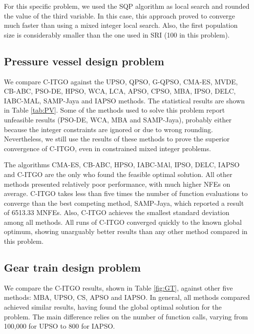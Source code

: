 For this specific problem, we used the SQP algorithm as local search and rounded the value of the third variable. In this case, this approach proved to converge much faster than using a mixed integer local search. Also, the first population size is considerably smaller than the one used in SRI (100 in this problem).



\subsection{Pressure vessel design problem}




We compare C-ITGO against the UPSO, QPSO, G-QPSO, CMA-ES, MVDE, CB-ABC, PSO-DE, HPSO, WCA, LCA, APSO, CPSO, MBA, IPSO, DELC, IABC-MAL, SAMP-Jaya and IAPSO methods. The statistical results are shown in Table \ref{tab:PV}. Some of the methods used to solve this problem report unfeasible results (PSO-DE, WCA, MBA and SAMP-Jaya), probably either because the integer constraints are ignored or due to wrong rounding. Nevertheless, we still use the results of these methods to prove the superior convergence of C-ITGO, even in constrained mixed integer problems.





The algorithms CMA-ES, CB-ABC, HPSO, IABC-MAl, IPSO, DELC, IAPSO and C-ITGO are the only who found the feasible optimal solution. All other methods presented relatively poor performance, with much higher NFEs on average. C-ITGO takes less than five times the number of function evaluations to converge than the best competing method, SAMP-Jaya, which reported a result of 6513.33 MNFEs. Also, C-ITGO achieves the smallest standard deviation among all methods. All runs of C-ITGO converged quickly to the known global optimum, showing unarguably better results than any other method compared in this problem.



\subsection{Gear train design problem}




We compare the C-ITGO results, shown in Table \ref{fig:GT}, against other five methods: MBA, UPSO, CS, APSO and IAPSO. In general, all methods compared achieved similar results, having found the global optimal solution for the problem. The main difference relies on the number of function calls, varying from 100,000 for UPSO to 800 for IAPSO.

